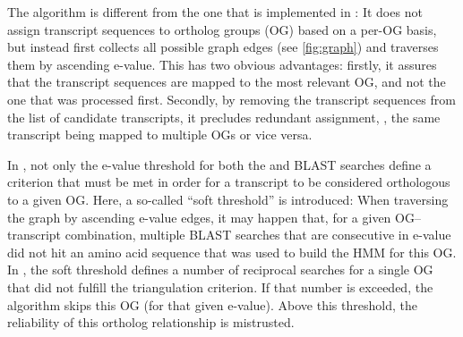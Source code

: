 The \pname algorithm is different from the one that is implemented in \hamstr:
It does not assign transcript sequences to ortholog groups (OG) based on a
per-OG basis, but instead first collects all possible graph edges (see
\autoref{fig:graph}) and traverses them by ascending  e-value. This has
two obvious advantages: firstly, it assures that the transcript sequences are
mapped to the most relevant OG, and not the one that was processed first.
Secondly, by removing the transcript sequences from the list of candidate
transcripts, it precludes redundant assignment, \ie, the same transcript being
mapped to multiple OGs or vice versa.

In \pname, not only the e-value threshold for both the  and BLAST
searches define a criterion that must be met in order for a transcript to be
considered orthologous to a given OG. Here, a so-called ``soft threshold'' is
introduced: When traversing the graph by ascending  e-value edges, it
may happen that, for a given OG--transcript combination, multiple BLAST searches
that are consecutive in e-value did not hit an amino acid sequence that was used
to build the HMM for this OG. In \pname, the soft threshold defines a number of
reciprocal searches for a single OG that did not fulfill the triangulation
criterion. If that number is exceeded, the algorithm skips this OG (for that
given  e-value). Above this threshold, the reliability of this ortholog
relationship is mistrusted.

